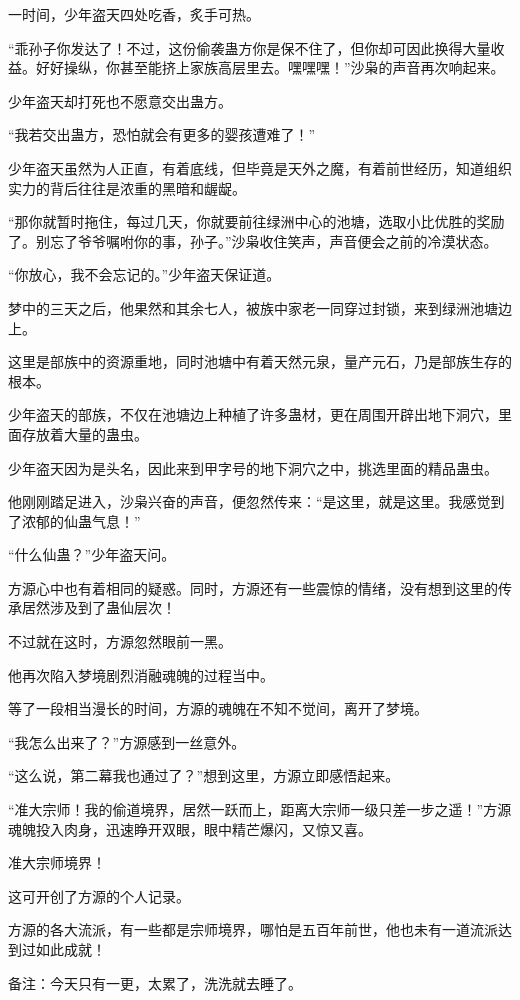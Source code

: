 \begin{this_body}
一时间，少年盗天四处吃香，炙手可热。

“乖孙子你发达了！不过，这份偷袭蛊方你是保不住了，但你却可因此换得大量收益。好好操纵，你甚至能挤上家族高层里去。嘿嘿嘿！”沙枭的声音再次响起来。

少年盗天却打死也不愿意交出蛊方。

“我若交出蛊方，恐怕就会有更多的婴孩遭难了！”

少年盗天虽然为人正直，有着底线，但毕竟是天外之魔，有着前世经历，知道组织实力的背后往往是浓重的黑暗和龌龊。

“那你就暂时拖住，每过几天，你就要前往绿洲中心的池塘，选取小比优胜的奖励了。别忘了爷爷嘱咐你的事，孙子。”沙枭收住笑声，声音便会之前的冷漠状态。

“你放心，我不会忘记的。”少年盗天保证道。

梦中的三天之后，他果然和其余七人，被族中家老一同穿过封锁，来到绿洲池塘边上。

这里是部族中的资源重地，同时池塘中有着天然元泉，量产元石，乃是部族生存的根本。

少年盗天的部族，不仅在池塘边上种植了许多蛊材，更在周围开辟出地下洞穴，里面存放着大量的蛊虫。

少年盗天因为是头名，因此来到甲字号的地下洞穴之中，挑选里面的精品蛊虫。

他刚刚踏足进入，沙枭兴奋的声音，便忽然传来：“是这里，就是这里。我感觉到了浓郁的仙蛊气息！”

“什么仙蛊？”少年盗天问。

方源心中也有着相同的疑惑。同时，方源还有一些震惊的情绪，没有想到这里的传承居然涉及到了蛊仙层次！

不过就在这时，方源忽然眼前一黑。

他再次陷入梦境剧烈消融魂魄的过程当中。

等了一段相当漫长的时间，方源的魂魄在不知不觉间，离开了梦境。

“我怎么出来了？”方源感到一丝意外。

“这么说，第二幕我也通过了？”想到这里，方源立即感悟起来。

“准大宗师！我的偷道境界，居然一跃而上，距离大宗师一级只差一步之遥！”方源魂魄投入肉身，迅速睁开双眼，眼中精芒爆闪，又惊又喜。

准大宗师境界！

这可开创了方源的个人记录。

方源的各大流派，有一些都是宗师境界，哪怕是五百年前世，他也未有一道流派达到过如此成就！

备注：今天只有一更，太累了，洗洗就去睡了。

\end{this_body}

